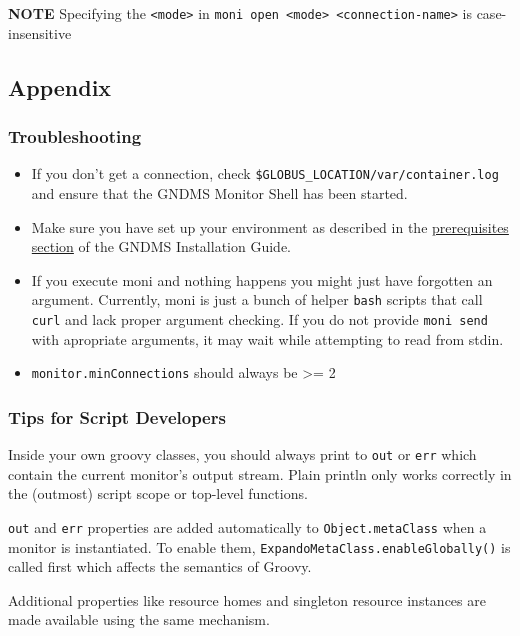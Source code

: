 \documentclass{article}
\begin{document}
\textbf{NOTE} Specifying the \verb!<mode>! in
\verb!moni open <mode> <connection-name>! is case-insensitive

\subsection{Appendix}

\subsubsection{Troubleshooting}

\begin{itemize}
\item
  If you don't get a connection, check
  \verb!$GLOBUS_LOCATION/var/container.log! and ensure that the GNDMS
  Monitor Shell has been started.

\item
  Make sure you have set up your environment as described in the
  \href{/installation-guide/#prerequisites}{prerequisites section} of
  the GNDMS Installation Guide.

\item
  If you execute moni and nothing happens you might just have
  forgotten an argument. Currently, moni is just a bunch of helper
  \verb!bash! scripts that call \verb!curl! and lack proper argument
  checking. If you do not provide \verb!moni send! with apropriate
  arguments, it may wait while attempting to read from stdin.

\item
  \verb!monitor.minConnections! should always be \textgreater{}= 2

\end{itemize}
\subsubsection{Tips for Script Developers}

Inside your own groovy classes, you should always print to
\verb!out! or \verb!err! which contain the current monitor's output
stream. Plain println only works correctly in the (outmost) script
scope or top-level functions.

\verb!out! and \verb!err! properties are added automatically to
\verb!Object.metaClass! when a monitor is instantiated. To enable
them, \verb!ExpandoMetaClass.enableGlobally()! is called first
which affects the semantics of Groovy.

Additional properties like resource homes and singleton resource
instances are made available using the same mechanism.
\end{document}
